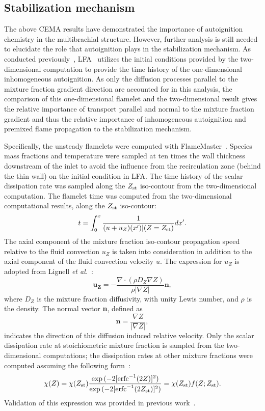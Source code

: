 \documentclass[review,3p,times]{elsarticle}
\begin{document}
\subsection{Stabilization mechanism} 
The above CEMA results have demonstrated the importance of autoignition chemistry in the multibrachial structure.  However, further analysis is still needed to elucidate the role that autoignition plays in the stabilization mechanism.  As conducted previously~\cite{deng15}, LFA~\cite{pitsch98a} utilizes the initial conditions provided by the two-dimensional computation to provide the time history of the one-dimensional inhomogeneous autoignition.  As only the diffusion processes parallel to the mixture fraction gradient direction are accounted for in this analysis, the comparison of this one-dimensional flamelet and the two-dimensional result gives the relative importance of transport parallel and normal to the mixture fraction gradient and thus the relative importance of inhomogeneous autoignition and premixed flame propagation to the stabilization mechanism.

Specifically, the unsteady flamelets were computed with FlameMaster~\cite{flamemaster}.  Species mass fractions and temperature were sampled at ten times the wall thickness downstream of the inlet to avoid the influence from the recirculation zone (behind the thin wall) on the initial condition in LFA.  The time history of the scalar dissipation rate was sampled along the $Z_{\rm st}$ iso-contour from the two-dimensional computation.  The flamelet time was computed from the two-dimensional computational results, along the $Z_{\rm st}$ iso-contour: 
 \begin{equation} \label{eq:t}
t = \int ^{x}_{0} \frac{1}{(u + u_Z)(x')|(Z=Z_{\rm st})} dx'.
\end{equation} 
The axial component of the mixture fraction iso-contour propagation speed relative to the fluid convection $u_Z$ is taken into consideration in addition to the axial component of the fluid convection velocity $u$.  The expression for $u_Z$ is adopted from Lignell \emph {et al.}~\cite{lignell07}:
\begin{equation}
\mathbf{u_Z} = -\frac{\nabla \cdot (\rho D_Z \nabla Z) }{\rho |\nabla Z|} \mathbf{n},
\end{equation}
where $D_Z$ is the mixture fraction diffusivity, with unity Lewis number, and $\rho$ is the density.  The normal vector \textbf{n}, defined as
\begin{equation}
\mathbf{n} = \frac{\nabla Z}{|\nabla Z|},
\end{equation}
indicates the direction of this diffusion induced relative velocity.  Only the scalar dissipation rate at stoichiometric mixture fraction is sampled from the two-dimensional computations; the dissipation rates at other mixture fractions were computed assuming the following form~\cite{petersbook}:
\begin{equation} \label{eq:Zref}
\chi{(Z)} = \chi{(Z_{\rm st})} \frac{\exp{(-2[{\rm erfc}^{-1}(2Z)]^2)}}{\exp{(-2[{\rm erfc}^{-1}(2Z_{\rm st})]^2)}} = \chi{(Z_{\rm st})} f(Z;Z_{\rm st}).
\end{equation}
Validation of this expression was provided in previous work~\cite{deng15}.
\end{document}
